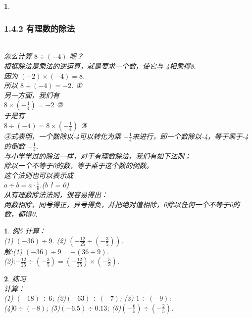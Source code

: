 \documentclass[11pt]{article}
\newtheorem{exercise}{ }
\newtheorem{article}{ }
\begin{document}
\begin{article}
\subsubsection*{1.4.2 有理数的除法} \\
怎么计算 $ 8\div(-4)$ 呢？\\
根据除法是乘法的逆运算，就是要求一个数，使它与-4相乘得8.\\
因为  $ (-2)\times(-4) = 8 $.\\
所以  $ 8\div(-4) = -2$.  ①\\
另一方面，我们有  \\
    $  8\times (-\frac{1}{4})=-2 $ ②\\
于是有 \\
    $ 8 \div (-4) = 8\times (-\frac{1}{4}) $ ③\\
③式表明，一个数除以-4可以转化为乘 $-\frac{1}{4}$来进行，即一个数除以-4，等于乘于-4的倒数 $ -\frac{1}{4}$.\\
    与小学学过的除法一样，对于有理数除法，我们有如下法则；\\
    除以一个不等于0的数，等于乘于这个数的倒数。\\
    这个法则也可以表示成\\
        $ a\div b=a \cdot \frac{1}{b}$.(b！= 0) \\
        从有理数除法法则，很容易得出：\\
        两数相除，同号得正，异号得负，并把绝对值相除，0除以任何一个不等于0的数，都得0.\\
\end{article}


\begin{exercise}
例5 计算：\\
(1) $ (-36)\div 9 $. (2) $ (- \frac{12}{25} \div (- \frac{3}{5})) $.\\
解:(1) $ (-36)\div 9 = -(36 \div 9) $.\\

(2):$ - \frac{12}{25} \div (- \frac{3}{5}) = (- \frac{12}{25}) \times (- \frac{5}{3})  $.\\
\end{exercise}

\begin{exercise}
练习\\

计算：\\
(1) $(-18) \div 6 $;
(2)$(-63) \div (-7)$;
(3) $ 1 \div (-9) $; \\
(4)$ 0 \div (-8) $;
(5)$(-6.5) \div 0.13$;
(6)$(-\frac{6}{5}) \div (-\frac{2}{5})$.
\end{exercise}
\end{document}
